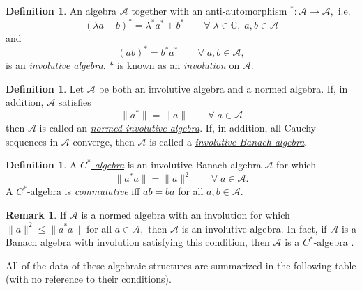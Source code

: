 \documentclass[12pt]{article}
\theoremstyle{theorem}
\theoremstyle{definition}
\newtheorem{definition}[equation]{Definition}
\newtheorem{remark}[equation]{Remark}
\numberwithin{equation}{section}
\let\l=\lambda \let\r=\rho
\let\C=\Chi \let\W=\Omega
\newcommand{\be}{\begin{equation}}
\newcommand{\ee}{\end{equation}}
\newcommand{\bd}{\begin{definition}}
\newcommand{\ed}{\end{definition}}
\newcommand{\br}{\begin{remark}}
\newcommand{\er}{\end{remark}}
\newcommand{\<}{\langle}
\renewcommand{\>}{\rangle}
\def\C{{{\mathbb C}}}
\def\mA{{{\mathcal{A}}}}
\begin{document}
\bd
An algebra $\mA$ together with an anti-automorphism 
${}^{*}:\mA\to\mA,$ i.e.
\be
(\l a+b)^{*}=\l^{*}a^{*}+b^{*}
\qquad\forall\;\l\in\C,\;a,b\in\mA
\ee
and
\be
(ab)^*=b^*a^*\qquad\forall\;a,b\in\mA,
\ee
is an \emph{\uline{involutive algebra}}.
$*$ is known as an \emph{\uline{involution}} on $\mA.$ 
\ed

\bd
Let $\mA$ be both an involutive algebra and a normed algebra.
If, in addition, $\mA$ satisfies 
\be
\lVert a^*\rVert=\lVert a\rVert\qquad\forall\;a\in\mA
\ee
then $\mA$ is called an \emph{\uline{normed involutive algebra}}.
If, in addition, all Cauchy sequences in $\mA$ converge, 
then $\mA$ is called a \emph{\uline{involutive Banach algebra}}. 
\ed

\bd
\label{defn:C*algebra}
A \emph{\uline{$C^*$-algebra}} is an involutive Banach algebra $\mA$ for which 
\be
\lVert a^*a\rVert=\lVert a\rVert^2 \qquad\forall\;a\in\mA.
\ee
A $C^*$-algebra is \emph{\uline{commutative}} iff 
$ab=ba$ for all $a,b\in\mA.$ 
\ed

\br
If $\mA$ is a normed algebra with an involution for which 
$\lVert a\rVert^2\le\lVert a^*a\rVert$ for all $a\in\mA,$
then $\mA$ is an involutive algebra. In fact, if $\mA$
is a Banach algebra with involution satisfying this condition, 
then $\mA$ is a $C^*$-algebra \cite{Di77}. 
\er

All of the data of these algebraic structures are
summarized in the following table (with no reference
to their conditions). 
\end{document}
